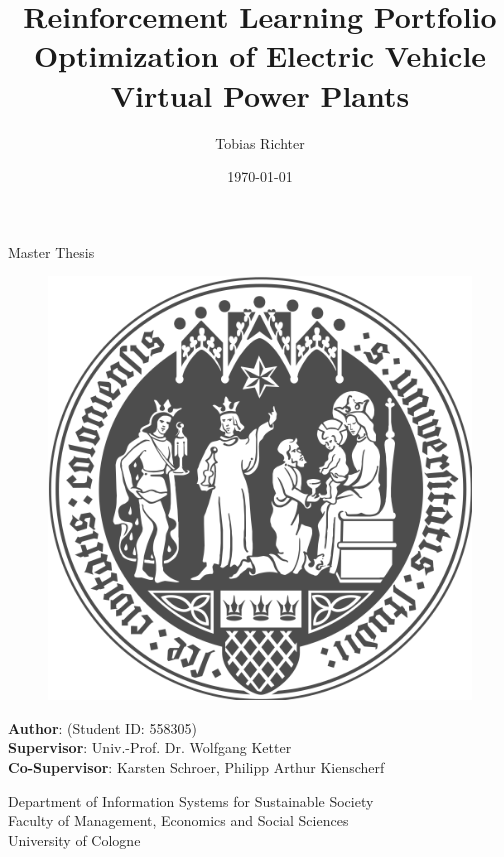 \documentclass[a4paper, twoside, 12pt]{article}
\author{Tobias Richter}
\date{\today}
\title{Reinforcement Learning Portfolio Optimization of Electric Vehicle Virtual Power Plants}
\newcommand{\studentID}{558305}
\newcommand{\thesistype}{Master Thesis}
\newcommand{\supervisor}{Univ.-Prof. Dr. Wolfgang Ketter}
\newcommand{\cosupervisor}{Karsten Schroer, Philipp Arthur Kienscherf}
\begin{document}
\makeatletter
\begin{titlepage}
    \begin{center}
        \vspace*{1cm}

        \Large
        \textbf{\@title{}}

        \vspace{1.5cm}

        \thesistype{}

        \vspace{1cm}

        \begin{figure}[htbp]
             \centering
             \includegraphics[width=.5\linewidth]{./fig/UoC_Logo.png}
        \end{figure}

        \vspace{1cm}

        \large
        \textbf{Author}: \@author{} (Student ID: \studentID{})\\
        \large
        \textbf{Supervisor}: \supervisor{}\\
        \large
        \textbf{Co-Supervisor}: \cosupervisor{}

        \vspace{1cm}
        \large
        Department of Information Systems for Sustainable Society\\
        Faculty of Management, Economics and Social Sciences\\
        University of Cologne\\

        \vspace{1cm}
        \@date{}

    \end{center}
\end{titlepage}
\makeatother
\clearpage
\thispagestyle{empty}
\end{document}
